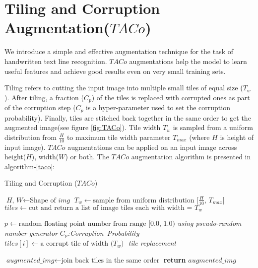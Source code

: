 \documentclass{article}
\begin{document}
\section{Tiling and Corruption Augmentation($TACo$)} \label{taco_section}
We introduce a simple and effective augmentation technique for the task of handwritten text line recognition. $TACo$ augmentations help the model to learn useful features and achieve good results even on very small training sets. 

Tiling refers to cutting the input image into multiple small tiles of equal size ($T_w$). After tiling, a fraction ($C_p$) of the tiles is replaced with corrupted ones as part of the corruption step ($C_p$ is a hyper-parameter used to set the corruption probability). Finally, tiles are stitched back together in the same order to get the augmented image(see figure \ref{fig:TACo}). Tile width $T_w$ is sampled from a uniform distribution from $\frac{H}{10}$ to maximum tile width parameter $T_{max}$ (where $H$ is height of input image). $TACo$ augmentations can be applied on an input image across height($H$), width($W$) or both. The $TACo$ augmentation algorithm is presented in algorithm-\ref{taco}:

\makeatletter
\def\BState{\State\hskip-\ALG@thistlm}
\makeatother

\begin{algorithm}
\caption{Tiling and Corruption ($TACo$)}\label{taco}
\begin{algorithmic}[1]
\State $\textit{H, W} \gets \text{Shape of }\textit{img}$
\State $T_w \gets \text{sample from uniform distribution [$\frac{H}{10}$, $T_{max}$]}$
\State $\textit{tiles} \gets \text{cut and return a list of image tiles each with width = $T_w$}$

        \State $\textit{$p$} \gets \text{random floating point number from range [0.0, 1.0)}$
        \Comment \emph{using pseudo-random number generator}
                \Comment \emph{$C_p$:Corruption\ Probability}
                \State $\textit{$tiles[i]$} \gets \text{a corrupt tile of width ($T_w$) }$
                \Comment \emph{tile replacement}
            \EndIf
    \EndFor
    
\State $\textit{augmented\_img} \gets \text{join back tiles in the same order}$
\State \textbf{return} {$augmented\_img$}
\EndProcedure
\end{algorithmic}
\end{algorithm}
\end{document}
